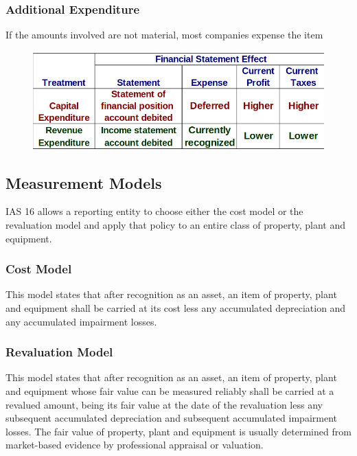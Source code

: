 \documentclass[../main.tex]{subfiles}
\begin{document}
	\subsubsection{Additional Expenditure}
	
	If the amounts involved are not material, most companies expense the item


	\begin{figure}[ht]
		\centering
		\includegraphics[width=1\columnwidth]{images/c8/additional_expenditures.png}
	\end{figure}

	\subsection{Measurement Models}
	
	IAS 16 allows a reporting entity to choose either the cost model or the 
	revaluation model and apply that policy to an entire class of property, 
	plant and equipment.
	
	\subsubsection{Cost Model}
	
	This model states that after recognition as an asset, an 
	item of property, plant and equipment shall be carried at its cost less any 
	accumulated depreciation and any accumulated impairment losses.
	
	\subsubsection{Revaluation Model}
	
	This model states that after recognition as an asset, an item of property, 
	plant and equipment whose fair value can be measured reliably shall be 
	carried at a revalued amount, being its fair value at the date of the 
	revaluation less any subsequent accumulated depreciation and subsequent 
	accumulated impairment losses. The fair value of property, plant and 
	equipment is usually determined from market-based evidence by professional 
	appraisal or valuation.
	
\end{document}

